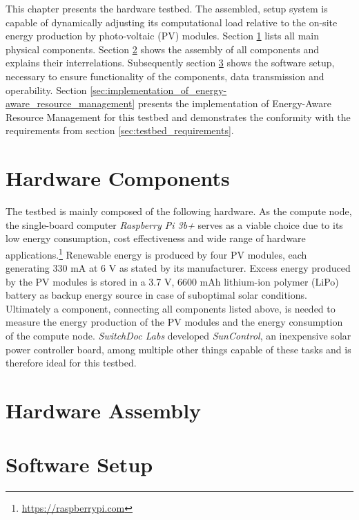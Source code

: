 This chapter presents the hardware testbed. The assembled, setup system is
capable of dynamically adjusting its computational load relative to the on-site
energy production by photo-voltaic (PV) modules. Section
\ref{sec:hardware_components} lists all main physical components. Section
\ref{sec:hardware_assembly} shows the assembly of all components and explains
their interrelations. Subsequently section \ref{sec:software_setup} shows the
software setup, necessary to ensure functionality of the components, data
transmission and operability.  Section
\ref{sec:implementation_of_energy-aware_resource_management} presents the
implementation of Energy-Aware Resource Management for this testbed and
demonstrates the conformity with the requirements from section
\ref{sec:testbed_requirements}.

\section{Hardware Components}
\label{sec:hardware_components}

The testbed is mainly composed of the following hardware. As the compute node,
the single-board computer \emph{Raspberry Pi 3b+} serves as a viable choice due
to its low energy consumption, cost effectiveness and wide range of hardware
applications.\footnote{\url{https://raspberrypi.com}} Renewable energy is
produced by four PV modules, each generating 330 mA at 6 V as stated by its
manufacturer. Excess energy produced by the PV modules is stored in a 3.7 V,
6600 mAh lithium-ion polymer (LiPo) battery as backup energy source in case of
suboptimal solar conditions. Ultimately a component, connecting all components
listed above, is needed to measure the energy production of the PV modules and
the energy consumption of the compute node. \emph{SwitchDoc Labs} developed
\emph{SunControl}, an inexpensive solar power controller board, among multiple
other things capable of these tasks \cite{switchdoc_suncontrol} and is therefore
ideal for this testbed.

\section{Hardware Assembly}
\label{sec:hardware_assembly}

\section{Software Setup}
\label{sec:software_setup}

